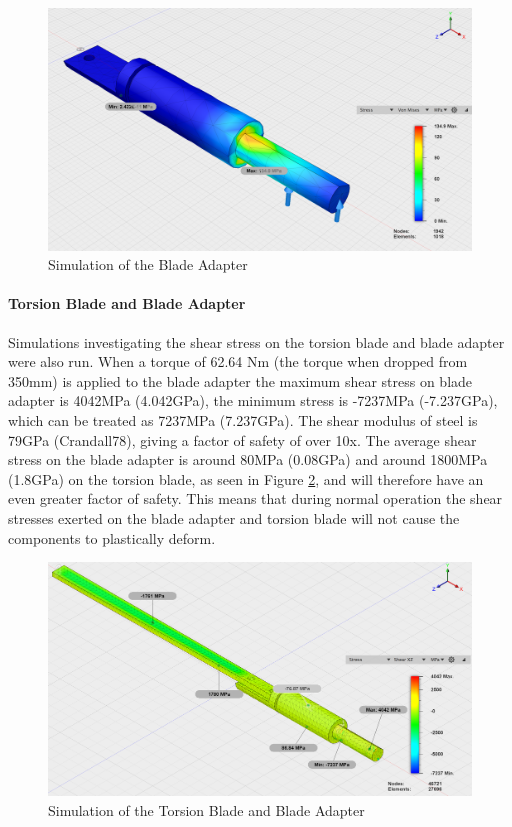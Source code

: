\begin{figure}[h]
\centering\includegraphics[width=0.6\linewidth]{Images/MaxImages/BladeAdapterSim.png}
\caption{Simulation of the Blade Adapter}
\label{fig:BladeAdapterSim}
\end{figure}

\paragraph{Torsion Blade and Blade Adapter}

Simulations investigating the shear stress on the torsion blade and  blade adapter were also run. When a torque of 62.64 Nm (the torque when dropped from 350mm) is applied to the blade adapter the maximum shear stress on blade adapter is 4042MPa (4.042GPa), the minimum stress is -7237MPa (-7.237GPa), which can be treated as 7237MPa (7.237GPa). The shear modulus of steel is 79GPa (Crandall78), giving a factor of safety of over 10x. The average shear stress on the blade adapter is around 80MPa (0.08GPa) and around 1800MPa (1.8GPa) on the torsion blade, as seen in Figure \ref{fig:TorsionBladeandAdapter}, and will therefore have an even greater factor of safety. This means that during normal operation the shear stresses exerted on the blade adapter and torsion blade will not cause the components to plastically deform.

\begin{figure}[h]
\centering\includegraphics[width=0.6\linewidth]{Images/MaxImages/TorsionBladeandAdapter.png}
\caption{Simulation of the Torsion Blade and Blade Adapter}
\label{fig:TorsionBladeandAdapter}
\end{figure}
